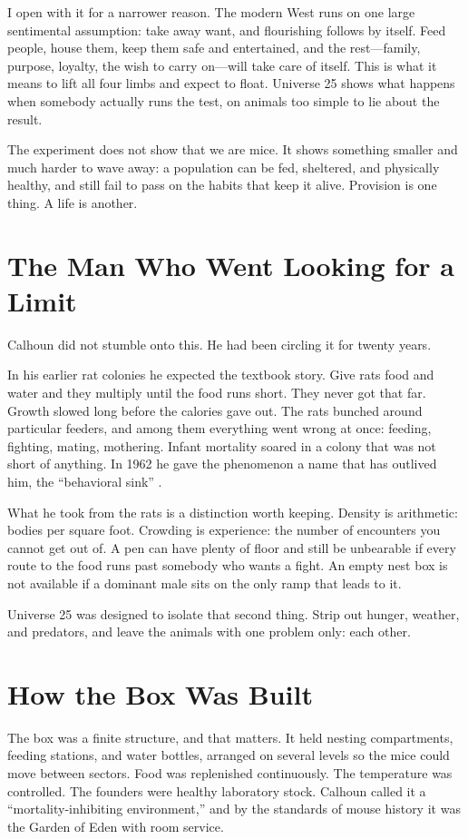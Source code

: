\documentclass[12pt,a4paper]{book}
\begin{document}
I open with it for a narrower reason. The modern West runs on one large sentimental assumption: take away want, and flourishing follows by itself. Feed people, house them, keep them safe and entertained, and the rest---family, purpose, loyalty, the wish to carry on---will take care of itself. This is what it means to lift all four limbs and expect to float. Universe 25 shows what happens when somebody actually runs the test, on animals too simple to lie about the result.

The experiment does not show that we are mice. It shows something smaller and much harder to wave away: a population can be fed, sheltered, and physically healthy, and still fail to pass on the habits that keep it alive. Provision is one thing. A life is another.

\section{The Man Who Went Looking for a Limit}

Calhoun did not stumble onto this. He had been circling it for twenty years.

In his earlier rat colonies he expected the textbook story. Give rats food and water and they multiply until the food runs short. They never got that far. Growth slowed long before the calories gave out. The rats bunched around particular feeders, and among them everything went wrong at once: feeding, fighting, mating, mothering. Infant mortality soared in a colony that was not short of anything. In 1962 he gave the phenomenon a name that has outlived him, the ``behavioral sink'' \cite{calhoun1962}.

What he took from the rats is a distinction worth keeping. Density is arithmetic: bodies per square foot. Crowding is experience: the number of encounters you cannot get out of. A pen can have plenty of floor and still be unbearable if every route to the food runs past somebody who wants a fight. An empty nest box is not available if a dominant male sits on the only ramp that leads to it.

Universe 25 was designed to isolate that second thing. Strip out hunger, weather, and predators, and leave the animals with one problem only: each other.

\section{How the Box Was Built}

The box was a finite structure, and that matters. It held nesting compartments, feeding stations, and water bottles, arranged on several levels so the mice could move between sectors. Food was replenished continuously. The temperature was controlled. The founders were healthy laboratory stock. Calhoun called it a ``mortality-inhibiting environment,'' and by the standards of mouse history it was the Garden of Eden with room service.
\end{document}
